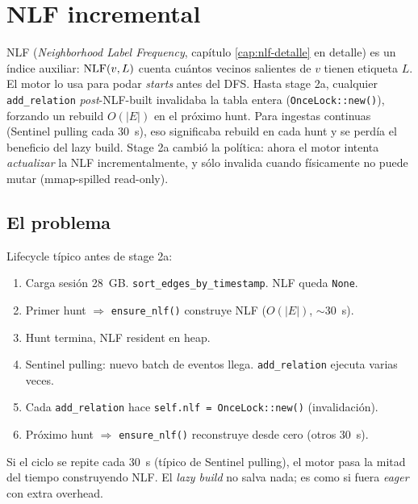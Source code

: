 \chapter{NLF incremental}
\label{cap:incremental-nlf}

\begin{intuicion}
NLF (\emph{Neighborhood Label Frequency}, capítulo
\ref{cap:nlf-detalle} en detalle) es un índice auxiliar:
\(\mathrm{NLF}(v, L)\) cuenta cuántos vecinos salientes de \(v\) tienen
etiqueta \(L\). El motor lo usa para podar \emph{starts} antes del
DFS. Hasta stage 2a, cualquier \texttt{add\_relation} \emph{post}-NLF-built
invalidaba la tabla entera (\texttt{OnceLock::new()}), forzando un
rebuild $O(|E|)$ en el próximo hunt. Para ingestas continuas
(Sentinel pulling cada 30~s), eso significaba rebuild en cada hunt
y se perdía el beneficio del lazy build. Stage 2a cambió la
política: ahora el motor intenta \emph{actualizar} la NLF
incrementalmente, y sólo invalida cuando físicamente no puede
mutar (mmap-spilled read-only).
\end{intuicion}

\section{El problema}

Lifecycle típico antes de stage 2a:

\begin{enumerate}
    \item Carga sesión 28~GB. \texttt{sort\_edges\_by\_timestamp}.
    NLF queda \texttt{None}.
    \item Primer hunt $\Rightarrow$ \texttt{ensure\_nlf()} construye
    NLF (\(O(|E|)\), $\sim$30~s).
    \item Hunt termina, NLF resident en heap.
    \item Sentinel pulling: nuevo batch de eventos llega.
    \texttt{add\_relation} ejecuta varias veces.
    \item Cada \texttt{add\_relation} hace
    \texttt{self.nlf = OnceLock::new()} (invalidación).
    \item Próximo hunt $\Rightarrow$ \texttt{ensure\_nlf()}
    reconstruye desde cero (otros 30~s).
\end{enumerate}

\noindent
Si el ciclo se repite cada 30~s (típico de Sentinel pulling), el
motor pasa la mitad del tiempo construyendo NLF. El \emph{lazy
build} no salva nada; es como si fuera \emph{eager} con extra
overhead.

